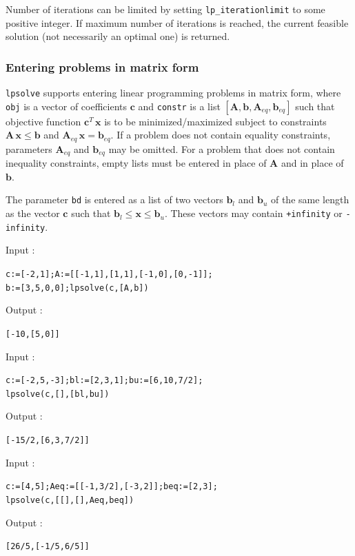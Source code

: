 \documentclass[a4paper,11pt]{book}
\begin{document}
Number of iterations can be limited by setting {\tt lp\_iterationlimit} to some positive integer. If maximum number of iterations is reached, the current feasible solution (not necessarily an optimal one) is returned.

\subsubsection{Entering problems in matrix form}
{\tt lpsolve} supports entering linear programming problems in matrix form, where {\tt obj} is a vector of coefficients $ \mathbf{c} $ and {\tt constr} is a list $ [\mathbf{A},\mathbf{b},\mathbf{A}_{eq},\mathbf{b}_{eq}] $ such that objective function $ \mathbf{c}^T\,\mathbf{x} $ is to be minimized/maximized subject to constraints $ \mathbf{A}\,\mathbf{x}\leq\mathbf{b} $ and $ \mathbf{A}_{eq}\,\mathbf{x}=\mathbf{b}_{eq} $. If a problem does not contain equality constraints, parameters $ \mathbf{A}_{eq} $ and $ \mathbf{b}_{eq} $ may be omitted. For a problem that does not contain inequality constraints, empty lists must be entered in place of $ \mathbf{A} $ and in place of $ \mathbf{b} $.

The parameter {\tt bd} is entered as a list of two vectors $ \mathbf{b}_l $ and $ \mathbf{b}_u $ of the same length as the vector $ \mathbf{c} $ such that $ \mathbf{b}_l\leq\mathbf{x}\leq\mathbf{b}_u $. These vectors may contain {\tt +infinity} or {\tt -infinity}.

\noindent Input :
\begin{center}
	{\tt c:=[-2,1];A:=[[-1,1],[1,1],[-1,0],[0,-1]];}\\
	{\tt b:=[3,5,0,0];lpsolve(c,[A,b])}
\end{center}
Output :
\begin{center}
	{\tt [-10,[5,0]]}
\end{center}
Input :
\begin{center}
	{\tt c:=[-2,5,-3];bl:=[2,3,1];bu:=[6,10,7/2];}\\
	{\tt lpsolve(c,[],[bl,bu])}
\end{center}
Output :
\begin{center}
	{\tt [-15/2,[6,3,7/2]]}
\end{center}
Input :
\begin{center}
	{\tt c:=[4,5];Aeq:=[[-1,3/2],[-3,2]];beq:=[2,3];}\\
	{\tt lpsolve(c,[[],[],Aeq,beq])}
\end{center}
Output :
\begin{center}
	{\tt [26/5,[-1/5,6/5]]}
\end{center}
\end{document}
